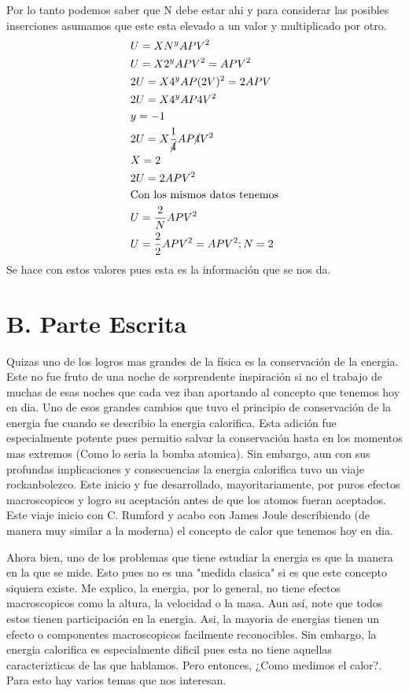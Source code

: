 \documentclass[12pt]{exam}
\begin{document}
\begin{enumerate}
		Por lo tanto podemos saber que N debe estar ahi y para considerar las posibles inserciones asumamos que este esta elevado a un valor y multiplicado por otro.
		\begin{align*}
			& U = XN^yAPV^2\\
			& U = X2^{y}APV^2 = APV^2\\
			& 2U = X4^{y}AP(2V)^2 = 2APV\\
			& 2U = X4^{y}AP4V^{2}\\
			& y = -1\\
			& 2U = X\frac{1}{\cancel{4}}AP\cancel{4}V^2\\
			& X = 2\\
			& 2U = 2APV^2\\
			& \text{Con los mismos datos tenemos}\\
			& U = \frac{2}{N}APV^2\\
			& U = \frac{2}{2}APV^2 = APV^2 ; N= 2\\
		\end{align*}
		Se hace con estos valores pues esta es la información que se nos da.
		\end{enumerate}

\section*{B. Parte Escrita}

Quizas uno de los logros mas grandes de la física es la conservación de la energia. Este no fue fruto de una noche de sorprendente inspiración si no el trabajo de muchas de esas noches que cada vez iban aportando al concepto que tenemos hoy en dia. Uno de esos grandes cambios que tuvo el principio de conservación de la energia fue cuando se describio la energia calorifica. Esta adición fue especialmente potente pues permitio salvar la conservación hasta en los momentos mas extremos (Como lo seria la bomba atomica). Sin embargo, aun con sus profundas implicaciones y consecuencias la energia calorifica tuvo un viaje rockanbolezco. Este inicio y fue desarrollado, mayoritariamente, por puros efectos macroscopicos y logro su aceptación antes de que los atomos fueran aceptados. Este viaje inicio con C. Rumford y acabo con James Joule describiendo (de manera muy similar a la moderna) el concepto de calor que tenemos hoy en dia.

Ahora bien, uno de los problemas que tiene estudiar la energia es que la manera en la que se mide. Esto pues no es una "medida clasica" si es que este concepto siquiera existe. Me explico, la energia, por lo general, no tiene efectos macroscopicos como la altura, la velocidad o la masa. Aun así, note que todos estos tienen participación en la energia. Asi, la mayoria de energias tienen un efecto o componentes macroscopicos facilmente reconocibles. Sin embargo, la energia calorifica es especialmente dificil pues esta no tiene aquellas caracterizticas de las que hablamos. Pero entonces, ¿Como medimos el calor?. Para esto hay varios temas que nos interesan. 
\end{document}
